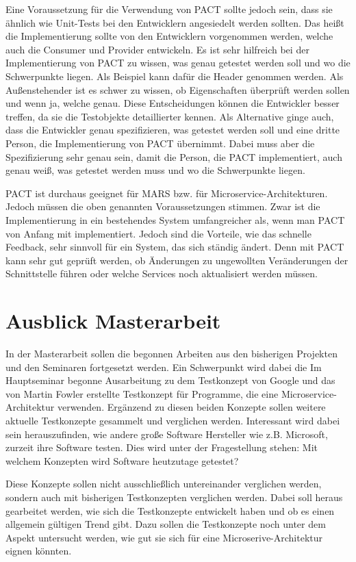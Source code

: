 \documentclass{llncs}
\begin{document}
Eine Voraussetzung für die Verwendung von PACT sollte jedoch sein, dass sie ähnlich wie Unit-Tests bei den Entwicklern angesiedelt werden sollten. Das heißt die Implementierung sollte von den Entwicklern vorgenommen werden, welche auch die Consumer und Provider entwickeln. Es ist sehr hilfreich bei der Implementierung von PACT zu wissen, was genau getestet werden soll und wo die Schwerpunkte liegen. Als Beispiel kann dafür die Header genommen werden. Als Außenstehender ist es schwer zu wissen, ob Eigenschaften überprüft werden sollen und wenn ja, welche genau. Diese Entscheidungen können die Entwickler besser treffen, da sie die Testobjekte detaillierter kennen. Als Alternative ginge auch, dass die Entwickler genau spezifizieren, was getestet werden soll und eine dritte Person, die Implementierung von PACT übernimmt. Dabei muss aber die Spezifizierung sehr genau sein, damit die Person, die PACT implementiert, auch genau weiß, was getestet werden muss und wo die Schwerpunkte liegen. 

PACT ist durchaus geeignet für MARS bzw. für Microservice-Architekturen. Jedoch müssen die oben genannten Voraussetzungen stimmen. Zwar ist die Implementierung in ein bestehendes System umfangreicher als, wenn man PACT von Anfang mit implementiert. Jedoch sind die Vorteile, wie das schnelle Feedback, sehr sinnvoll für ein System, das sich ständig ändert. Denn mit PACT kann sehr gut geprüft werden, ob Änderungen zu ungewollten Veränderungen der Schnittstelle führen oder welche Services noch aktualisiert werden müssen.

\section{Ausblick Masterarbeit}
In der Masterarbeit sollen die begonnen Arbeiten aus den bisherigen Projekten und den Seminaren fortgesetzt werden. Ein Schwerpunkt wird dabei die Im Hauptseminar begonne Ausarbeitung zu dem Testkonzept von Google und das von Martin Fowler erstellte Testkonzept für Programme, die eine Microservice-Architektur verwenden. Ergänzend zu diesen beiden Konzepte sollen weitere aktuelle Testkonzepte gesammelt und verglichen werden. Interessant wird dabei sein herauszufinden, wie andere große Software Hersteller wie z.B. Microsoft, zurzeit ihre Software testen. Dies wird unter der Fragestellung stehen: Mit welchem Konzepten wird Software heutzutage getestet?

Diese Konzepte sollen nicht ausschließlich untereinander verglichen werden, sondern auch mit bisherigen Testkonzepten verglichen werden. Dabei soll heraus gearbeitet werden, wie sich die Testkonzepte entwickelt haben und ob es einen allgemein gültigen Trend gibt. Dazu sollen die Testkonzepte noch unter dem Aspekt untersucht werden, wie gut sie sich für eine Microserive-Architektur eignen könnten.
\end{document}
